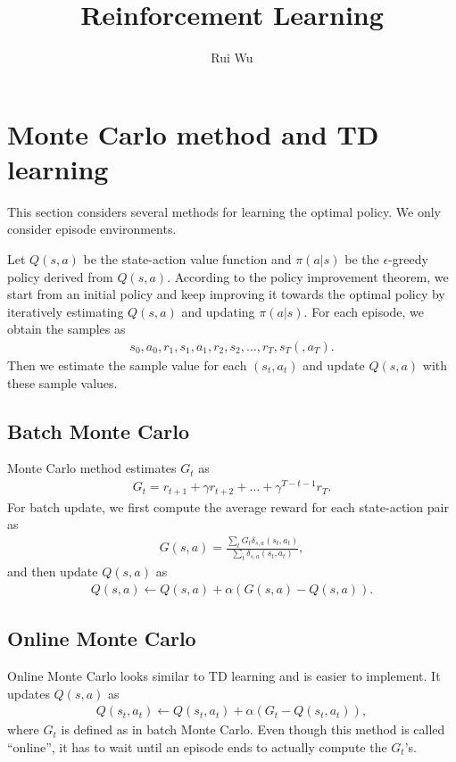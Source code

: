 \documentclass[onecolumn, 12pt]{IEEEtran}
\newcommand\1[1]{\mathbb{I}_{\left\{#1\right\}}}
\begin{document}
\title{Reinforcement Learning}
\author{Rui Wu}
\maketitle

\section{Monte Carlo method and TD learning}

This section considers several methods for learning the optimal policy. We only consider episode environments.

Let $Q(s, a)$ be the state-action value function and $\pi(a|s)$ be the $\epsilon$-greedy policy derived from $Q(s, a)$. According to the policy improvement theorem, we start from an initial policy and keep improving it towards the optimal policy by iteratively estimating $Q(s, a)$ and updating $\pi(a|s)$. For each episode, we obtain the samples as
\begin{align*}
  s_0, a_0, r_1, s_1, a_1, r_2, s_2, \dots, r_T, s_T (, a_T).
\end{align*}
Then we estimate the sample value for each $(s_t, a_t)$ and update $Q(s, a)$ with these sample values.

\subsection{Batch Monte Carlo}
Monte Carlo method estimates $G_t$ as
\begin{align*}
  G_t = r_{t+1} + \gamma r_{t + 2} + \dots + \gamma^{T-t - 1}r_T. 
\end{align*}
For batch update, we first compute the average reward for each state-action pair as
\begin{align*}
  G(s, a) = \frac{\sum_t{G_t\delta_{s, a}(s_t, a_t)}}{\sum_t{\delta_{s, a}(s_t, a_t)}},
\end{align*}
and then update $Q(s, a)$ as
\begin{align*}
  Q(s, a) \leftarrow Q(s, a) + \alpha(G(s, a) - Q(s, a)). 
\end{align*}

\subsection{Online Monte Carlo}
Online Monte Carlo looks similar to TD learning and is easier to implement. It updates $Q(s, a)$ as
\begin{align*}
  Q(s_t, a_t) \leftarrow Q(s_t, a_t) + \alpha(G_t - Q(s_t, a_t)),
\end{align*}
where $G_t$ is defined as in batch Monte Carlo. Even though this method is called ``online'', it has to wait until an episode ends to actually compute the $G_t$'s.
\end{document}
